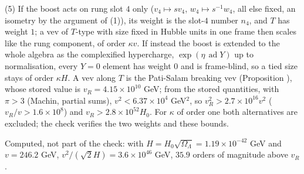 (5) If the boost acts on rung slot $4$ only ($v_{4} \mapsto sv_{4}$, $w_{4} \mapsto s^{-1}w_{4}$, all else fixed, an isometry by the argument of (1)), its weight is the slot-$4$ number $n_{4}$, and $T$ has weight $1$; a vev of $T$-type with size fixed in Hubble units in one frame then scales like the rung component, of order $\kappa v$. If instead the boost is extended to the whole algebra as the complexified hypercharge, $\exp(\eta\,\operatorname{ad} Y)$ up to normalisation, every $Y = 0$ element has weight $0$ and is frame-blind, so a tied size stays of order $\kappa H$. A vev along $T$ is the Pati-Salam breaking vev (Proposition ), whose stored value is $v_{R} = 4.15 \times 10^{10}$ GeV; from the stored quantities, with $\pi > 3$ (Machin, partial sums), $v^{2} < 6.37 \times 10^{4}$ GeV$^{2}$, so $v_{R}^{2} > 2.7 \times 10^{16}v^{2}$ ($v_{R}/v > 1.6 \times 10^{8}$) and $v_{R} > 2.8 \times 10^{52}H_{0}$. For $\kappa$ of order one both alternatives are excluded; the check verifies the two weights and these bounds.

Computed, not part of the check: with $H = H_{0}\sqrt{\Omega_{\Lambda}} = 1.19 \times 10^{-42}$ GeV and $v = 246.2$ GeV, $v^{2}/(\sqrt{2}H) = 3.6 \times 10^{46}$ GeV, $35.9$ orders of magnitude above $v_{R}$.